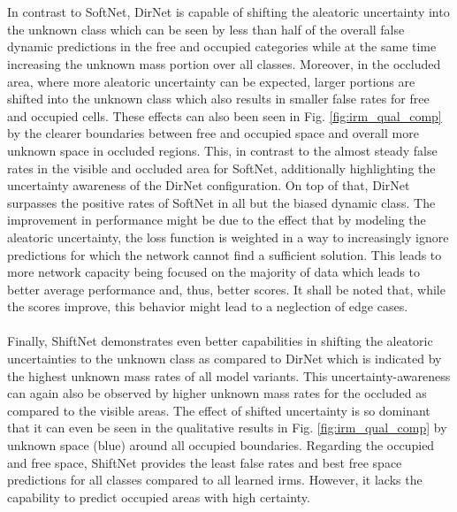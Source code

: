 \\\\
In contrast to SoftNet, DirNet is capable of shifting the aleatoric uncertainty into the unknown class which can be seen by less than half of the overall false dynamic predictions in the free and occupied categories while at the same time increasing the unknown mass portion over all classes. Moreover, in the occluded area, where more aleatoric uncertainty can be expected, larger portions are shifted into the unknown class which also results in smaller false rates for free and occupied cells. These effects can also been seen in Fig. \ref{fig:irm_qual_comp} by the clearer boundaries between free and occupied space and overall more unknown space in occluded regions. This, in contrast to the almost steady false rates in the visible and occluded area for SoftNet, additionally highlighting the uncertainty awareness of the DirNet configuration. On top of that, DirNet surpasses the positive rates of SoftNet in all but the biased dynamic class. The improvement in performance might be due to the effect that by modeling the aleatoric uncertainty, the loss function is weighted in a way to increasingly ignore predictions for which the network cannot find a sufficient solution. This leads to more network capacity being focused on the majority of data which leads to better average performance and, thus, better scores. It shall be noted that, while the scores improve, this behavior might lead to a neglection of edge cases.
\\\\
Finally, ShiftNet demonstrates even better capabilities in shifting the aleatoric uncertainties to the unknown class as compared to DirNet which is indicated by the highest unknown mass rates of all model variants. This uncertainty-awareness can again also be observed by higher unknown mass rates for the occluded as compared to the visible areas. The effect of shifted uncertainty is so dominant that it can even be seen in the qualitative results in Fig. \ref{fig:irm_qual_comp} by unknown space (blue) around all occupied boundaries. Regarding the occupied and free space, ShiftNet provides the least false rates and best free space predictions for all classes compared to all learned \gls{irm}s. However, it lacks the capability to predict occupied areas with high certainty.
\\\\
